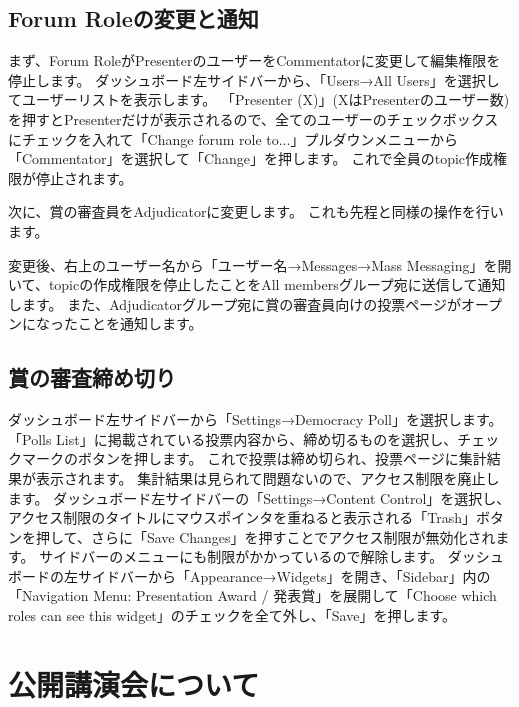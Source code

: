 \documentclass[titlepage,10pt,a4paper,uplatex]{jsbook}
\begin{document}
\subsection{Forum Roleの変更と通知}

まず、Forum RoleがPresenterのユーザーをCommentatorに変更して編集権限を停止します。
ダッシュボード左サイドバーから、「Users→All Users」を選択してユーザーリストを表示します。
「Presenter (X)」(XはPresenterのユーザー数)を押すとPresenterだけが表示されるので、全てのユーザーのチェックボックスにチェックを入れて「Change forum role to...」プルダウンメニューから「Commentator」を選択して「Change」を押します。
これで全員のtopic作成権限が停止されます。

次に、賞の審査員をAdjudicatorに変更します。
これも先程と同様の操作を行います。

変更後、右上のユーザー名から「ユーザー名→Messages→Mass Messaging」を開いて、topicの作成権限を停止したことをAll membersグループ宛に送信して通知します。
また、Adjudicatorグループ宛に賞の審査員向けの投票ページがオープンになったことを通知します。

\subsection{賞の審査締め切り}

ダッシュボード左サイドバーから「Settings→Democracy Poll」を選択します。
「Polls List」に掲載されている投票内容から、締め切るものを選択し、チェックマークのボタンを押します。
これで投票は締め切られ、投票ページに集計結果が表示されます。
集計結果は見られて問題ないので、アクセス制限を廃止します。
ダッシュボード左サイドバーの「Settings→Content Control」を選択し、アクセス制限のタイトルにマウスポインタを重ねると表示される「Trash」ボタンを押して、さらに「Save Changes」を押すことでアクセス制限が無効化されます。
サイドバーのメニューにも制限がかかっているので解除します。
ダッシュボードの左サイドバーから「Appearance→Widgets」を開き、「Sidebar」内の「Navigation Menu: Presentation Award / 発表賞」を展開して「Choose which roles can see this widget」のチェックを全て外し、「Save」を押します。

\section{公開講演会について}
\end{document}
